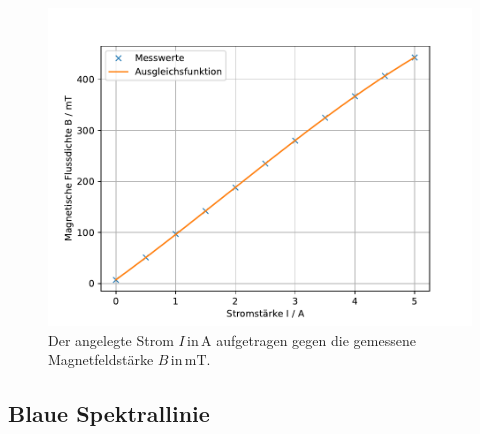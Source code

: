 \begin{figure}
    \centering
    \includegraphics[width=\textwidth]{content/data/magnetfeld.pdf}
    \caption{Der angelegte Strom $I \, \text{in} \, \si{\ampere}$ aufgetragen gegen die gemessene Magnetfeldstärke $B \, \text{in} \, \si{\milli\tesla}$.}
    \label{fig:Magnetfeld}
\end{figure}

\subsection{Blaue Spektrallinie}

